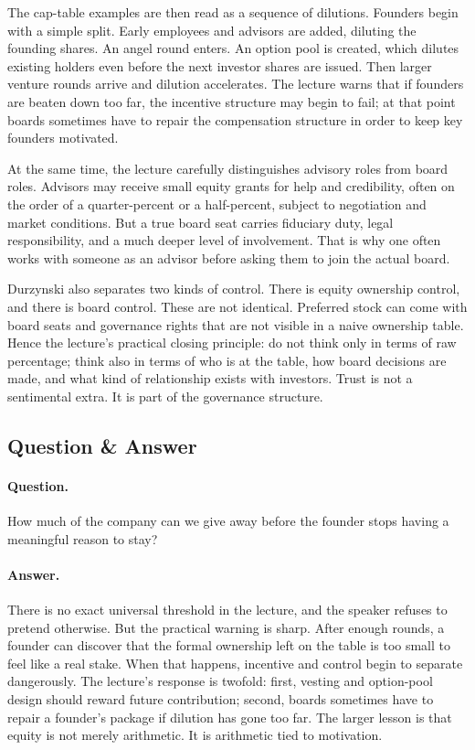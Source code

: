 The cap-table examples are then read as a sequence of dilutions. Founders begin with a simple split. Early employees and advisors are added, diluting the founding shares. An angel round enters. An option pool is created, which dilutes existing holders even before the next investor shares are issued. Then larger venture rounds arrive and dilution accelerates. The lecture warns that if founders are beaten down too far, the incentive structure may begin to fail; at that point boards sometimes have to repair the compensation structure in order to keep key founders motivated.

At the same time, the lecture carefully distinguishes advisory roles from board roles. Advisors may receive small equity grants for help and credibility, often on the order of a quarter-percent or a half-percent, subject to negotiation and market conditions. But a true board seat carries fiduciary duty, legal responsibility, and a much deeper level of involvement. That is why one often works with someone as an advisor before asking them to join the actual board.

Durzynski also separates two kinds of control. There is equity ownership control, and there is board control. These are not identical. Preferred stock can come with board seats and governance rights that are not visible in a naive ownership table. Hence the lecture's practical closing principle: do not think only in terms of raw percentage; think also in terms of who is at the table, how board decisions are made, and what kind of relationship exists with investors. Trust is not a sentimental extra. It is part of the governance structure.

\subsection{Question \& Answer}

\paragraph{Question.}
How much of the company can we give away before the founder stops having a meaningful reason to stay?

\paragraph{Answer.}
There is no exact universal threshold in the lecture, and the speaker refuses to pretend otherwise. But the practical warning is sharp. After enough rounds, a founder can discover that the formal ownership left on the table is too small to feel like a real stake. When that happens, incentive and control begin to separate dangerously. The lecture's response is twofold: first, vesting and option-pool design should reward future contribution; second, boards sometimes have to repair a founder's package if dilution has gone too far. The larger lesson is that equity is not merely arithmetic. It is arithmetic tied to motivation.

